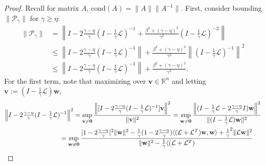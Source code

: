 \documentclass[a4paper,10pt]{article}
\begin{document}
\begin{proof}
Recall for matrix $A$, cond$(A) = \|A\|\|A^{-1}\|$.
First, consider bounding $\|\mathcal{P}_\gamma\|$ for $\gamma \geq \eta$:
%
\begin{align}\nonumber
\|\mathcal{P}_\gamma\| & = \left\| I - 2\frac{\gamma-\eta}
	{\gamma}\left(I - \tfrac{1}{\gamma}\mathcal{L}\right)^{-1} +
		\frac{\beta^2 + (\gamma-\eta)^2}{\gamma^2}
		\left(I - \tfrac{1}{\gamma}\mathcal{L}\right)^{-2} \right\| \\
& \leq \left\| I - 2\frac{\gamma-\eta}
	{\gamma}\left(I - \tfrac{1}{\gamma}\mathcal{L}\right)^{-1}\right\| +
		\frac{\beta^2 + (\gamma-\eta)^2}{\gamma^2}\left\|
		\left(I - \tfrac{1}{\gamma}\mathcal{L}\right)^{-1} \right\|^2 \nonumber \\
& \leq \left\| I - 2\frac{\gamma-\eta}
	{\gamma}\left(I - \tfrac{1}{\gamma}\mathcal{L}\right)^{-1}\right\| +
		\frac{\beta^2 + (\gamma-\eta)^2}{\gamma^2}. \label{eq:P0}
\end{align}
%
For the first term, note that maximizing over $\mathbf{v}\in\mathbb{R}^n$ and
letting $\mathbf{v} := (I - \tfrac{1}{\gamma}\mathcal{L})\mathbf{w}$,
%
\begin{align*}
\left\| I - 2\tfrac{\gamma-\eta}
	{\gamma}(I - \tfrac{1}{\gamma}\mathcal{L})^{-1}\right\|^2
		& = \sup_{\mathbf{v}\neq\mathbf{0}} \frac{\left\| [I - 2\frac{\gamma-\eta}
	{\gamma}(I - \tfrac{1}{\gamma}\mathcal{L})^{-1}]\mathbf{v}\right\|^2}{\|\mathbf{v}\|^2} 
= \sup_{\mathbf{w}\neq\mathbf{0}} \frac{\left\| (I - \tfrac{1}{\gamma}\mathcal{L} -
		2\frac{\gamma-\eta}{\gamma}I )\mathbf{w}\right\|^2}{\|(I - \tfrac{1}{\gamma}\mathcal{L})
		\mathbf{w}\|^2} \\
&\hspace{-5ex} = \sup_{\mathbf{w}\neq\mathbf{0}} \frac{|1 - 2\tfrac{\gamma-\eta}{\gamma}|^2\|\mathbf{w}\|^2
	- \tfrac{1}{\gamma}(1 - 2\tfrac{\gamma-\eta}{\gamma})\langle (\mathcal{L} + \mathcal{L}^T)
		\mathbf{w},\mathbf{w}\rangle + \tfrac{1}{\gamma}^2\|\mathcal{L}\mathbf{w}\|^2}
	{\|\mathbf{w}\|^2 - \tfrac{1}{\gamma}\langle (\mathcal{L} + \mathcal{L}^T)
}
\end{align*}
\end{proof}
\end{document}

